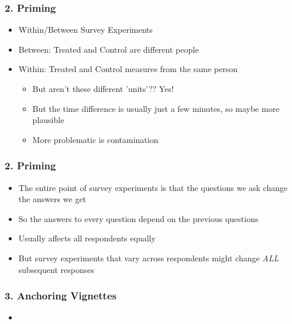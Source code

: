 \documentclass[xcolor=x11names,compress]{beamer}\usepackage[]{graphicx}\usepackage[]{color}
\renewcommand{\(}{\begin{columns}}
\renewcommand{\)}{\end{columns}}
\newcommand{\<}[1]{\begin{column}{#1}}
\renewcommand{\>}{\end{column}}
\begin{document}
\begin{frame}
\frametitle{2. Priming}
\begin{itemize}
\item Within/Between Survey Experiments
\pause
\item Between: Treated and Control are different people
\pause
\item Within: Treated and Control measures from the same person
\begin{itemize}
\item But aren't these different 'units'?? \pause Yes!
\pause
\item But the time difference is usually just a few minutes, so maybe more plausible
\pause
\item More problematic is contamination
\end{itemize}
\end{itemize}
\end{frame}

\begin{frame}
\frametitle{2. Priming}
\begin{itemize}
\pause 
\item The entire point of survey experiments is that the questions we ask change the answers we get
\pause
\item So the answers to every question depend on the previous questions
\pause 
\item Usually affects all respondents equally
\pause 
\item But survey experiments that vary across respondents might change \textit{ALL} subsequent responses
\end{itemize}
\end{frame}




\begin{frame}
\frametitle{3. Anchoring Vignettes}
\begin{itemize}
\pause 
\item 
\end{itemize}
\end{frame}

\end{document}
